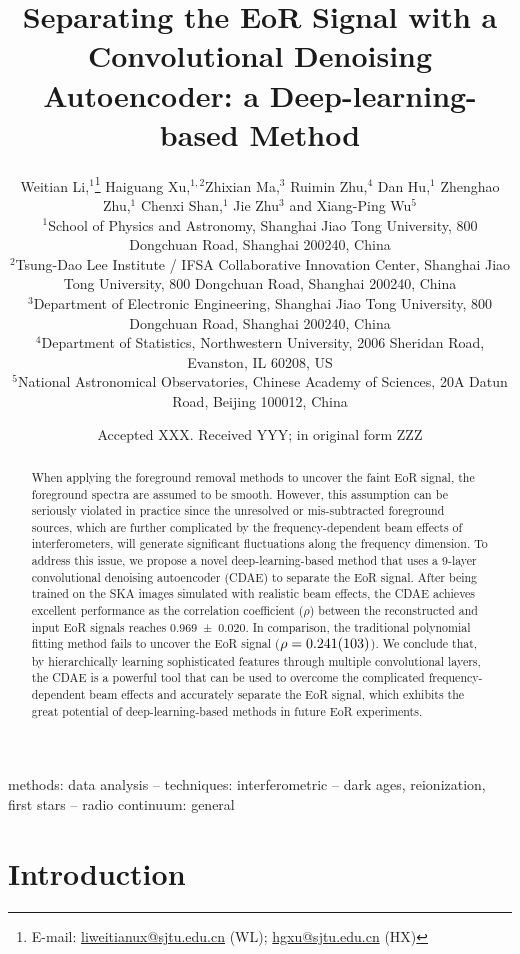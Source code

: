 \documentclass[letters,fleqn,usenatbib]{mnras}
\title[EoR Signal Separation with a CDAE]{%
  Separating the EoR Signal with a Convolutional Denoising Autoencoder:
  a Deep-learning-based Method
}
\author[Li~et~al.]{%
Weitian Li,$^{1}$\thanks{E-mail:
  \href{mailto:liweitianux@sjtu.edu.cn}{liweitianux@sjtu.edu.cn} (WL);
  \href{mailto:hgxu@sjtu.edu.cn}{hgxu@sjtu.edu.cn} (HX)}
Haiguang Xu,$^{1,2}$\footnotemark[1]
Zhixian Ma,$^{3}$
Ruimin Zhu,$^{4}$
Dan Hu,$^{1}$
Zhenghao Zhu,$^{1}$
\newauthor  %
Chenxi Shan,$^{1}$
Jie Zhu$^{3}$
and
Xiang-Ping Wu$^{5}$
\\
$^{1}${School of Physics and Astronomy,
  Shanghai Jiao Tong University,
  800 Dongchuan Road, Shanghai 200240, China} \\
$^{2}${Tsung-Dao Lee Institute / IFSA Collaborative Innovation Center,
  Shanghai Jiao Tong University,
  800 Dongchuan Road, Shanghai 200240, China} \\
$^{3}${Department of Electronic Engineering,
  Shanghai Jiao Tong University,
  800 Dongchuan Road, Shanghai 200240, China} \\
$^{4}${Department of Statistics,
  Northwestern University,
  2006 Sheridan Road, Evanston, IL 60208, US} \\
$^{5}${National Astronomical Observatories,
  Chinese Academy of Sciences,
  20A Datun Road, Beijing 100012, China}
}
\date{Accepted XXX. Received YYY; in original form ZZZ}
\begin{document}
\label{firstpage}
\pagerange{\pageref{firstpage}--\pageref{lastpage}}
\maketitle

%
%
\begin{abstract}
When applying the foreground removal methods to uncover the faint EoR
signal, the foreground spectra are assumed to be smooth.
However, this assumption can be seriously violated in practice since
the unresolved or mis-subtracted foreground sources, which are further
complicated by the frequency-dependent beam effects of interferometers,
will generate significant fluctuations along the frequency dimension.
To address this issue, we propose a novel deep-learning-based method
that uses a 9-layer convolutional denoising autoencoder (CDAE) to
separate the EoR signal.
After being trained on the SKA images simulated with realistic beam
effects, the CDAE achieves excellent performance as the correlation
coefficient ($\rho$) between the reconstructed and input EoR signals
reaches \num{0.969 +- 0.020}.
In comparison, the traditional polynomial fitting method fails to
uncover the EoR signal ($\rho = \num{0.241 +- 0.103}$).
We conclude that, by hierarchically learning sophisticated features
through multiple convolutional layers, the CDAE is a powerful tool that
can be used to overcome the complicated frequency-dependent beam effects
and accurately separate the EoR signal, which exhibits the great
potential of deep-learning-based methods in future EoR experiments.
\end{abstract}

\begin{keywords}
methods: data analysis --
techniques: interferometric --
dark ages, reionization, first stars --
radio continuum: general
\end{keywords}



\section{Introduction}
\label{sec:intro}
\end{document}
